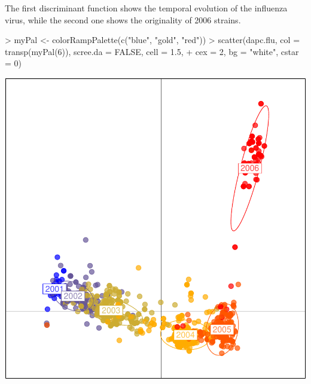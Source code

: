 \documentclass{article}
\begin{document}
The first discriminant function shows the temporal evolution of the influenza virus, while the
second one shows the originality of 2006 strains.
\begin{Schunk}
\begin{Sinput}
> myPal <- colorRampPalette(c("blue", "gold", "red"))
> scatter(dapc.flu, col = transp(myPal(6)), scree.da = FALSE, cell = 1.5, 
+     cex = 2, bg = "white", cstar = 0)
\end{Sinput}
\end{Schunk}
\includegraphics{figs/dapc-017}
\end{document}
